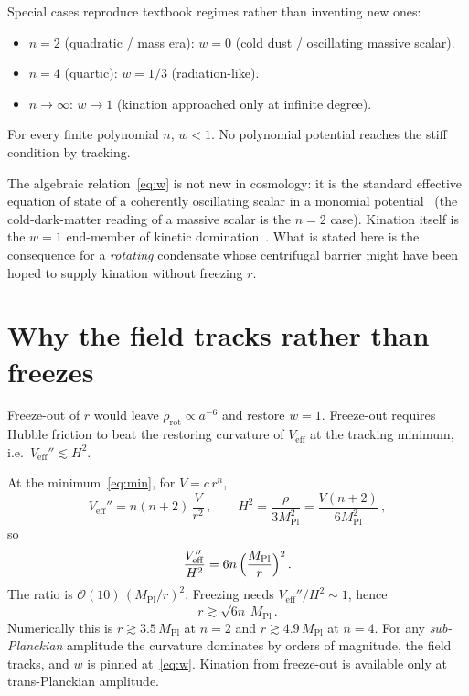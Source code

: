 \documentclass[aps,prd,twocolumn,superscriptaddress,nofootinbib,10pt]{revtex4-2}
\begin{document}
Special cases reproduce textbook regimes rather than inventing new ones:
\begin{itemize}
\item $n=2$ (quadratic / mass era): $w=0$ (cold dust / oscillating massive scalar).
\item $n=4$ (quartic): $w=1/3$ (radiation-like).
\item $n\to\infty$: $w\to 1$ (kination approached only at infinite degree).
\end{itemize}
For every finite polynomial $n$, $w<1$. No polynomial potential reaches the stiff condition by
tracking.

The algebraic relation~\eqref{eq:w} is not new in cosmology: it is the standard effective
equation of state of a coherently oscillating scalar in a monomial potential~\cite{Turner1983}
(the cold-dark-matter reading of a massive scalar is the $n=2$ case). Kination itself is the
$w=1$ end-member of kinetic domination~\cite{Spokoiny1993}. What is stated here is the
consequence for a \emph{rotating} condensate whose centrifugal barrier might have been hoped to
supply kination without freezing $r$.

\section{Why the field tracks rather than freezes}\label{sec:freeze}

Freeze-out of $r$ would leave $\rho_{\mathrm{rot}}\propto a^{-6}$ and restore $w=1$. Freeze-out
requires Hubble friction to beat the restoring curvature of $V_{\mathrm{eff}}$ at the tracking
minimum, i.e.\ $V_{\mathrm{eff}}''\lesssim H^{2}$.

At the minimum~\eqref{eq:min}, for $V=c\,r^{n}$,
\begin{equation}
  V_{\mathrm{eff}}''
  = n(n+2)\,\frac{V}{r^{2}}\,,
  \qquad
  H^{2}
  = \frac{\rho}{3M_{\mathrm{Pl}}^{2}}
  = \frac{V(n+2)}{6M_{\mathrm{Pl}}^{2}}\,,
\end{equation}
so
\begin{equation}
  \frac{V_{\mathrm{eff}}''}{H^{2}}
  = 6n\,\Bigl(\frac{M_{\mathrm{Pl}}}{r}\Bigr)^{2}\,.
  \label{eq:curv}
\end{equation}
The ratio is $\mathcal{O}(10)\,(M_{\mathrm{Pl}}/r)^{2}$. Freezing needs $V_{\mathrm{eff}}''/H^{2}\sim 1$,
hence
\begin{equation}
  r \gtrsim \sqrt{6n}\,M_{\mathrm{Pl}}\,.
\end{equation}
Numerically this is $r\gtrsim 3.5\,M_{\mathrm{Pl}}$ at $n=2$ and
$r\gtrsim 4.9\,M_{\mathrm{Pl}}$ at $n=4$.
For any \emph{sub-Planckian} amplitude the curvature dominates by orders of magnitude, the field
tracks, and $w$ is pinned at~\eqref{eq:w}. Kination from freeze-out is available only at
trans-Planckian amplitude.
\end{document}
